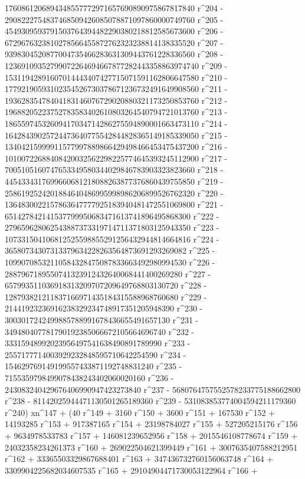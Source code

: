        1760861206894348557772971657690890975867817840 r^204 - 
       2908222754837468509426085078871097860000749760 r^205 - 
       4549309593791503764394482290380218812585673600 r^206 - 
       6729676323810278566455872762323238814138335520 r^207 - 
       9398304520877004735466283631309443761228336560 r^208 - 
       12369109352799072264694667877282443358863974740 r^209 - 
       15311942891607014443407427715071591162806647580 r^210 - 
       17792190593102354526730378671236732491649908560 r^211 - 
       19362835478404183146076729020880321173250853760 r^212 - 
       19688205223752783583402610803264540794721013760 r^213 - 
       18655974532609417034714286275594890001663473110 r^214 - 
       16428439025724473640775542844828365149185339050 r^215 - 
       13404215999911577997889866429498466453475437200 r^216 - 
       10100722688408420032562298225774645393245112900 r^217 - 
       7005105160747653349580344029846783903323823660 r^218 - 
       4454334317699660681218088263877376860439755850 r^219 - 
       2586192524201884640486995998986206899526762320 r^220 - 
       1364830022157863647777925183940481472551069800 r^221 - 
       651427842141537799950683471613741896495868300 r^222 - 
       279659628062543887373319714711371803125943350 r^223 - 
       107331504106812525598855291256432944814664816 r^224 - 
       36580734307313379634228263564873691293269082 r^225 - 
       10990708532110584328475087833663492980994530 r^226 - 
       2887967189550741323912432640068441400269280 r^227 - 
       657993511036918313209707209649768803130720 r^228 - 
       128793821211837166971435184315588968760680 r^229 - 
       21441923236916238329234748917351205948390 r^230 - 
       3003017242499885788991678436655491657130 r^231 - 
       349480407781790192385066672105664696740 r^232 - 
       33315948992023956497541638490891789990 r^233 - 
       2557177714003929232848595710642254590 r^234 - 
       154629769149199557433871192748831240 r^235 - 
       7155359798499078438243402060020160 r^236 - 
       243083240429676406990947423273840 r^237 - 
       5680764757552578233775188662800 r^238 - 
       81142025944471130501265189360 r^239 - 
       531083853774004594211179360 r^240) xn^147 + (40 r^149 + 
       3160 r^150 + 3600 r^151 + 167530 r^152 + 14193285 r^153 + 
       917387165 r^154 + 23198784027 r^155 + 527205215176 r^156 + 
       9634978533783 r^157 + 146081239652956 r^158 + 
       2015546108778674 r^159 + 24032358234261373 r^160 + 
       269022504621399449 r^161 + 3007635407588212951 r^162 + 
       33365503329867688401 r^163 + 347436732760156063748 r^164 + 
       3309904225682034607535 r^165 + 29104904471730053122964 r^166 + 
